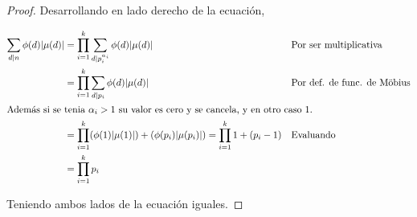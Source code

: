 \documentclass[letterpaper]{article}
\begin{document}
\begin{enumerate}
\begin{proof}
Desarrollando en lado derecho de la ecuación,

\begin{align*}
    \sum_{d \mid n} \phi(d) |\mu(d)|
        &= \prod_{i=1}^{k} \sum_{d \mid p_i^{\alpha_i}} \phi(d) |\mu(d)|
            && \text{Por ser multiplicativa}\\
        &= \prod_{i=1}^{k} \sum_{d \mid p_i} \phi(d) |\mu(d)|
        && \text{Por def. de func. de Möbius}\\
            \intertext{\centering
                Además si se tenia $\alpha_i > 1$ su valor es cero y se cancela, y en otro caso 1.}
        &= \prod_{i=1}^{k} (\phi(1) |\mu(1)|) + (\phi(p_i) |\mu(p_i)|)
            = \prod_{i=1}^{k} 1 + (p_i-1)
            && \text{Evaluando}\\
        &= \prod_{i=1}^{k} p_i
\end{align*}

Teniendo ambos lados de la ecuación iguales.
\end{proof}

\end{enumerate}






\end{document}

